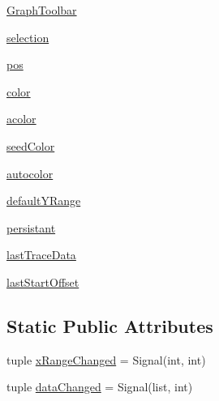 \begin{DoxyCompactItemize}
\item 
\hyperlink{classsoftware_1_1chipwhisperer_1_1common_1_1ui_1_1GraphWidget_1_1GraphWidget_acf49d34204ce9fbe6f0e7382656579d1}{Graph\+Toolbar}
\item 
\hyperlink{classsoftware_1_1chipwhisperer_1_1common_1_1ui_1_1GraphWidget_1_1GraphWidget_a1af636d2cc4d6ee63ba4f2ab9bcf1e2d}{selection}
\item 
\hyperlink{classsoftware_1_1chipwhisperer_1_1common_1_1ui_1_1GraphWidget_1_1GraphWidget_abb96624492154279ba1ba639d5efbbc2}{pos}
\item 
\hyperlink{classsoftware_1_1chipwhisperer_1_1common_1_1ui_1_1GraphWidget_1_1GraphWidget_af32d32435cc44318cd58a286fe2f0a46}{color}
\item 
\hyperlink{classsoftware_1_1chipwhisperer_1_1common_1_1ui_1_1GraphWidget_1_1GraphWidget_a961b46cf3956b4c17dca9cc06d3fd086}{acolor}
\item 
\hyperlink{classsoftware_1_1chipwhisperer_1_1common_1_1ui_1_1GraphWidget_1_1GraphWidget_abea4cc6b5fbf36d7a71bdf98525408b1}{seed\+Color}
\item 
\hyperlink{classsoftware_1_1chipwhisperer_1_1common_1_1ui_1_1GraphWidget_1_1GraphWidget_af3963871459dec56796ecd62253e9c9b}{autocolor}
\item 
\hyperlink{classsoftware_1_1chipwhisperer_1_1common_1_1ui_1_1GraphWidget_1_1GraphWidget_a4da467b169fff9a7e456e884ea58ede3}{default\+Y\+Range}
\item 
\hyperlink{classsoftware_1_1chipwhisperer_1_1common_1_1ui_1_1GraphWidget_1_1GraphWidget_a9832e2c8321ff1747bfcc42ebe97813b}{persistant}
\item 
\hyperlink{classsoftware_1_1chipwhisperer_1_1common_1_1ui_1_1GraphWidget_1_1GraphWidget_a9477e6c69fcb4f3b3b6f973f35e6946c}{last\+Trace\+Data}
\item 
\hyperlink{classsoftware_1_1chipwhisperer_1_1common_1_1ui_1_1GraphWidget_1_1GraphWidget_a4fbf18ac7163042daf94edd06f5370ed}{last\+Start\+Offset}
\end{DoxyCompactItemize}
\subsection*{Static Public Attributes}
\begin{DoxyCompactItemize}
\item 
tuple \hyperlink{classsoftware_1_1chipwhisperer_1_1common_1_1ui_1_1GraphWidget_1_1GraphWidget_a3ebff5f3a3ec489ed294e70234076937}{x\+Range\+Changed} = Signal(int, int)
\item 
tuple \hyperlink{classsoftware_1_1chipwhisperer_1_1common_1_1ui_1_1GraphWidget_1_1GraphWidget_a56381f07a284366a870597099d20baa6}{data\+Changed} = Signal(list, int)
\end{DoxyCompactItemize}


